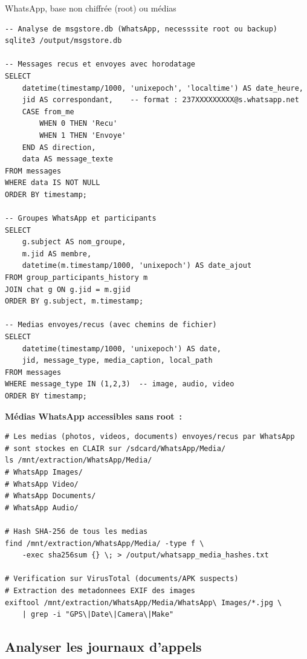 \begin{boxoutils}{WhatsApp, base non chiffrée (root) ou médias}
\begin{lstlisting}[language=bash_forensique]
-- Analyse de msgstore.db (WhatsApp, necesssite root ou backup)
sqlite3 /output/msgstore.db

-- Messages recus et envoyes avec horodatage
SELECT
    datetime(timestamp/1000, 'unixepoch', 'localtime') AS date_heure,
    jid AS correspondant,    -- format : 237XXXXXXXXX@s.whatsapp.net
    CASE from_me
        WHEN 0 THEN 'Recu'
        WHEN 1 THEN 'Envoye'
    END AS direction,
    data AS message_texte
FROM messages
WHERE data IS NOT NULL
ORDER BY timestamp;

-- Groupes WhatsApp et participants
SELECT
    g.subject AS nom_groupe,
    m.jid AS membre,
    datetime(m.timestamp/1000, 'unixepoch') AS date_ajout
FROM group_participants_history m
JOIN chat g ON g.jid = m.gjid
ORDER BY g.subject, m.timestamp;

-- Medias envoyes/recus (avec chemins de fichier)
SELECT
    datetime(timestamp/1000, 'unixepoch') AS date,
    jid, message_type, media_caption, local_path
FROM messages
WHERE message_type IN (1,2,3)  -- image, audio, video
ORDER BY timestamp;
\end{lstlisting}

\textbf{Médias WhatsApp accessibles sans root~:}
\begin{lstlisting}[language=bash_forensique]
# Les medias (photos, videos, documents) envoyes/recus par WhatsApp
# sont stockes en CLAIR sur /sdcard/WhatsApp/Media/
ls /mnt/extraction/WhatsApp/Media/
# WhatsApp Images/
# WhatsApp Video/
# WhatsApp Documents/
# WhatsApp Audio/

# Hash SHA-256 de tous les medias
find /mnt/extraction/WhatsApp/Media/ -type f \
    -exec sha256sum {} \; > /output/whatsapp_media_hashes.txt

# Verification sur VirusTotal (documents/APK suspects)
# Extraction des metadonnees EXIF des images
exiftool /mnt/extraction/WhatsApp/Media/WhatsApp\ Images/*.jpg \
    | grep -i "GPS\|Date\|Camera\|Make"
\end{lstlisting}
\end{boxoutils}

\subsection{Analyser les journaux d'appels}

